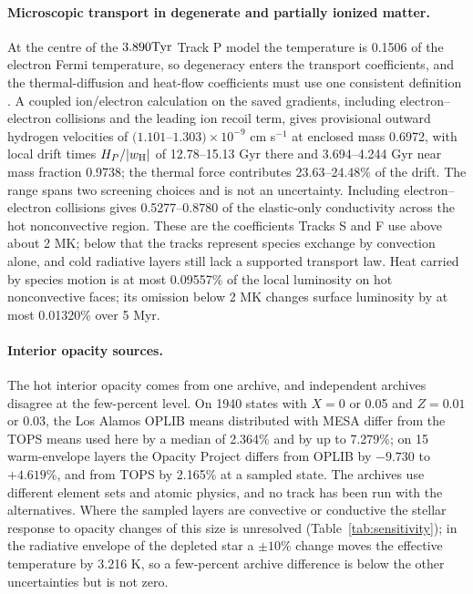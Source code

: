 \paragraph{Microscopic transport in degenerate and partially ionized matter.}
At the centre of the $3.890\mathrm{Tyr}$ Track P model the temperature is 0.1506
of the electron Fermi temperature, so degeneracy enters the transport
coefficients, and the thermal-diffusion and heat-flow coefficients must use
one consistent definition \cite{beznogov16,paxton18}. A coupled ion/electron
calculation on the saved gradients, including electron--electron collisions
and the leading ion recoil term, gives provisional outward hydrogen
velocities of $(1.101$--$1.303)\times10^{-9}$ cm s$^{-1}$ at enclosed mass
0.6972, with local drift times $H_P/|w_{\rm H}|$ of 12.78--15.13 Gyr there
and 3.694--4.244 Gyr near mass fraction 0.9738; the thermal force
contributes 23.63--24.48\% of the drift. The range spans two screening
choices and is not an uncertainty. Including electron--electron collisions
gives 0.5277--0.8780 of the elastic-only conductivity across the hot
nonconvective region. These are the coefficients Tracks S and F use above
about 2 MK; below that the tracks represent species exchange by convection
alone, and cold radiative layers still lack a supported transport law.
Heat carried by species motion is at most 0.09557\% of the local luminosity
on hot nonconvective faces; its omission below 2 MK changes surface
luminosity by at most 0.01320\% over 5 Myr.

\paragraph{Interior opacity sources.}
The hot interior opacity comes from one archive, and independent archives
disagree at the few-percent level. On 1940 states with $X=0$ or 0.05 and
$Z=0.01$ or 0.03, the Los Alamos OPLIB means distributed with MESA
\cite{farag24} differ from the TOPS means used here by a median of 2.364\%
and by up to 7.279\%; on 15 warm-envelope layers the Opacity Project
\cite{seaton05} differs from OPLIB by $-9.730$ to $+4.619\%$, and from TOPS
by 2.165\% at a sampled state. The archives use different element sets and
atomic physics, and no track has been run with the alternatives. Where the
sampled layers are convective or conductive the stellar response to opacity
changes of this size is unresolved (Table~\ref{tab:sensitivity}); in the
radiative envelope of the depleted star a $\pm10\%$ change moves the
effective temperature by 3.216 K, so a few-percent archive difference is
below the other uncertainties but is not zero.

